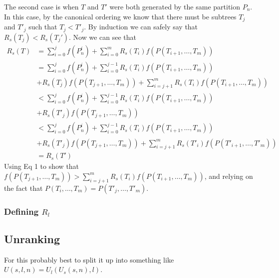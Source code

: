 \documentclass{article}
\begin{document}
The second case is when $T$ and $T'$ were both generated by the same
partition $P_n$. In this case, by the canonical ordering we know that
there must be subtrees $T_j$ and $T'_j$ such that $T_j < T'_j$. By
induction we can safely say that $R_s(T_j) < R_s(T_j')$. Now we can see
that
\begin{align*}
    R_s(T)
    &= \sum_{i=0}^{j} f(P_n^i) + \sum_{i=0}^m R_s(T_i)f(P(T_{i+1}, \ldots, T_m))\\
    &= \sum_{i=0}^{j} f(P_n^i) + \sum_{i=0}^{j-1} R_s(T_i)f(P(T_{i+1}, \ldots, T_m))\\
    &+ R_s(T_j)f(P(T_{j+1}, \ldots, T_m)) + \sum_{i=j+1}^m R_s(T_i)f(P(T_{i+1}, \ldots, T_m))\\
    &< \sum_{i=0}^{j} f(P_n^i) + \sum_{i=0}^{j-1} R_s(T_i)f(P(T_{i+1}, \ldots, T_m))\\
    &+ R_s(T'_j)f(P(T_{j+1}, \ldots, T_m))\\
    &< \sum_{i=0}^{j} f(P_n^i) + \sum_{i=0}^{j-1} R_s(T_i)f(P(T_{i+1}, \ldots, T_m))\\
    &+ R_s(T'_j)f(P(T_{j+1}, \ldots, T_m)) + \sum_{i=j+1}^m R_s(T'_i)f(P(T'_{i+1}, \ldots, T'_m))\\
    &= R_s(T')
\end{align*}
Using Eq 1 to show that
$f(P(T_{j+1}, \ldots, T_m)) > \sum_{i=j+1}^m R_s(T_i)f(P(T_{i+1}, \ldots, T_m))$, and
relying on the fact that $P(T_i, \ldots, T_m) = P(T'_j, \ldots, T'_m)$.

\subsubsection{Defining $R_l$}

\subsection{Unranking}
For this probably best to split it up into something like
$U(s, l, n) = U_l(U_s(s, n), l)$.
\end{document}
